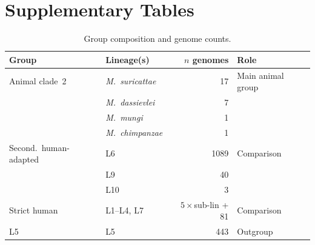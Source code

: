 \documentclass[11pt,a4paper]{article}
\begin{document}



\appendix

\section{Supplementary Tables}
\label{sec:supp_tables}

\begin{table}[h!]
\centering
\caption{Group composition and genome counts.}
\label{tab:groups}
\begin{tabular}{llrl}
\toprule
Group & Lineage(s) & $n$ genomes & Role \\
\midrule
Animal clade~2   & \textit{M.~suricattae}    & 17   & Main animal group \\
                 & \textit{M.~dassievlei}    & 7    & \\
                 & \textit{M.~mungi}         & 1    & \\
                 & \textit{M.~chimpanzae}    & 1    & \\
Second.\ human-adapted      & L6                        & 1089 & Comparison \\
                 & L9                        & 40   & \\
                 & L10                       & 3    & \\
Strict human     & L1--L4, L7                & $5\times$sub-lin + 81 & Comparison \\
L5               & L5                        & 443  & Outgroup \\
\bottomrule
\end{tabular}
\end{table}
\end{document}
